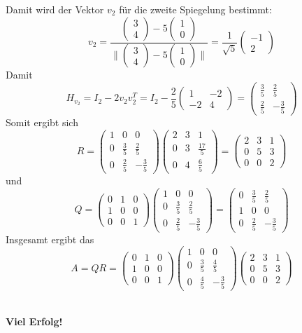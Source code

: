 \documentclass[a4paper,11pt]{scrartcl}
\begin{document}
Damit wird der Vektor $v_2$ für die zweite Spiegelung bestimmt:
$$
v_2=\frac{\begin{pmatrix}3\\4\end{pmatrix}-5\begin{pmatrix}1\\0\end{pmatrix}}{\|\begin{pmatrix}3\\4\end{pmatrix}-5\begin{pmatrix}1\\0\end{pmatrix}\|} =\frac{1}{\sqrt{5}}\begin{pmatrix}-1\\2 \end{pmatrix}
$$
Damit 
$$
H_{v_2}=I_2-2v_2v_2^T=I_2-\frac{2}{5}\begin{pmatrix}1 & -2 \\ -2 & 4 \end{pmatrix}=\begin{pmatrix} \frac{3}{5} & \frac{2}{5} \\ \frac{2}{5} & - \frac{3}{5}\end{pmatrix}
$$
Somit ergibt sich 
$$
R=\begin{pmatrix} 1&0&0\\0&\frac{3}{5} & \frac{2}{5} \\0&\frac{2}{5} & - \frac{3}{5}\end{pmatrix}\begin{pmatrix}2 & 3 & 1 \\ 0 & 3 & \frac{17}{5} \\ 0 & 4 & \frac{6}{5}\end{pmatrix}=\begin{pmatrix}2&3&1\\ 0&5 & 3 \\ 0&0&2 \end{pmatrix}
$$
und
$$
Q=\begin{pmatrix} 0&1&0\\1&0&0\\0&0&1\end{pmatrix}\begin{pmatrix} 1&0&0\\0&\frac{3}{5} & \frac{2}{5} \\0&\frac{2}{5} & - \frac{3}{5}\end{pmatrix}=\begin{pmatrix} 0&\frac{3}{5} & \frac{2}{5}\\1&0&0\\0&\frac{2}{5} & - \frac{3}{5}\end{pmatrix}
$$
Insgesamt ergibt das
$$
A=QR=\begin{pmatrix}0&1&0\\1&0&0\\0&0&1 \end{pmatrix}\begin{pmatrix}1&0&0\\0&\frac{3}{5}& \frac{4}{5}\\0&\frac{4}{5}&-\frac{3}{5} \end{pmatrix}\begin{pmatrix}2&3&1\\ 0&5 & 3 \\ 0&0&2 \end{pmatrix}
$$

\quad\\

\vfill \hfill \textbf{Viel Erfolg!}
\end{document}
